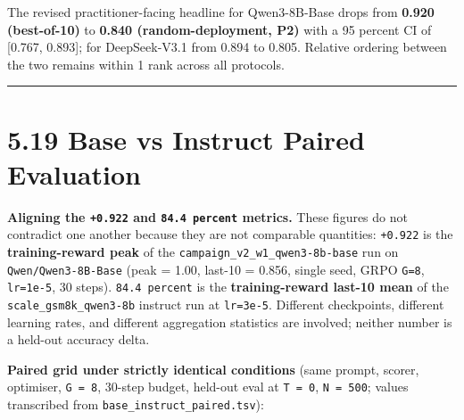 \documentclass[
  american,
  11pt,
  a4paper,
  oneside]{report}
\begin{document}
The revised practitioner-facing headline for Qwen3-8B-Base drops from
\textbf{0.920 (best-of-10)} to \textbf{0.840 (random-deployment, P2)}
with a 95 percent CI of {[}0.767, 0.893{]}; for DeepSeek-V3.1 from 0.894
to 0.805. Relative ordering between the two remains within 1 rank across
all protocols.

\begin{center}\rule{0.5\linewidth}{0.5pt}\end{center}

\subsubsection{}\label{section}

\section{5.19 Base vs Instruct Paired
Evaluation}\label{base-vs-instruct-paired-evaluation}

\textbf{Aligning the \texttt{+0.922} and \texttt{84.4\ percent}
metrics.} These figures do not contradict one another because they are
not comparable quantities: \texttt{+0.922} is the
\textbf{training-reward peak} of the
\texttt{campaign\_v2\_w1\_qwen3-8b-base} run on
\texttt{Qwen/Qwen3-8B-Base} (peak = 1.00, last-10 = 0.856, single seed,
GRPO \texttt{G=8}, \texttt{lr=1e-5}, 30 steps). \texttt{84.4\ percent}
is the \textbf{training-reward last-10 mean} of the
\texttt{scale\_gsm8k\_qwen3-8b} instruct run at \texttt{lr=3e-5}.
Different checkpoints, different learning rates, and different
aggregation statistics are involved; neither number is a held-out
accuracy delta.

\textbf{Paired grid under strictly identical conditions} (same prompt,
scorer, optimiser, \texttt{G\ =\ 8}, 30-step budget, held-out eval at
\texttt{T\ =\ 0}, \texttt{N\ =\ 500}; values transcribed from
\texttt{base\_instruct\_paired.tsv}):
\end{document}
